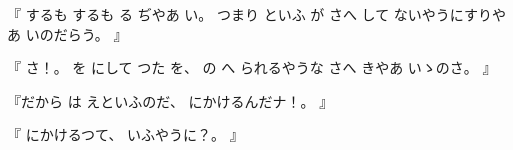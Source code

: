 %
『
するも
するも
る
ぢやあ
い。
%
つまり
といふ
が
さへ
して
ないやうにすりやあ
いのだらう。
』

%
『
さ！。
%
を
にして
つた
を、
%
の
へ
られるやうな
さへ
きやあ
いゝのさ。
』

%
『だから
は
えといふのだ、
%
にかけるんだナ！。
』

%
『
にかけるつて、
%
いふやうに？。
』

